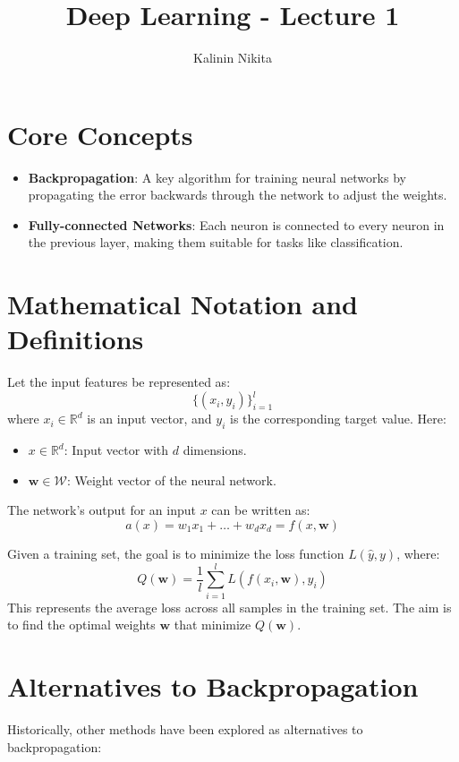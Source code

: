 \documentclass{article}
\title{Deep Learning - Lecture 1}
\author{Kalinin Nikita}
\date{}
\begin{document}
\maketitle
\tableofcontents
\newpage

\section{Core Concepts}
\begin{itemize}
    \item \textbf{Backpropagation}: A key algorithm for training neural networks by propagating the error backwards through the network to adjust the weights.
    \item \textbf{Fully-connected Networks}: Each neuron is connected to every neuron in the previous layer, making them suitable for tasks like classification.
\end{itemize}

\section{Mathematical Notation and Definitions}

Let the input features be represented as:
\[
\{(x_i, y_i)\}_{i=1}^{l}
\]
where \( x_i \in \mathbb{R}^d \) is an input vector, and \( y_i \) is the corresponding target value. Here:
\begin{itemize}
    \item \( x \in \mathbb{R}^d \): Input vector with \( d \) dimensions.
    \item \( \mathbf{w} \in \mathcal{W} \): Weight vector of the neural network.
\end{itemize}

The network's output for an input \( x \) can be written as:
\[
a(x) = w_1 x_1 + \dots + w_d x_d = f(x, \mathbf{w})
\]

Given a training set, the goal is to minimize the loss function \( L(\hat{y}, y) \), where:
\[
Q(\mathbf{w}) = \frac{1}{l} \sum_{i=1}^{l} L\left( f(x_i, \mathbf{w}), y_i \right)
\]
This represents the average loss across all samples in the training set. The aim is to find the optimal weights \( \mathbf{w} \) that minimize \( Q(\mathbf{w}) \).

\section{Alternatives to Backpropagation}

Historically, other methods have been explored as alternatives to backpropagation:
\end{document}

